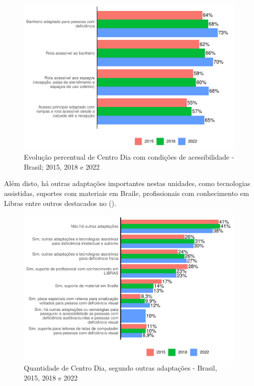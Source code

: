 \documentclass[
  brazilian]{report}
\begin{document}
\begin{figure}
\includegraphics{Censo-SUAS-2022_files/figure-latex/cdia-acessibilidade-1} \caption[Evolução percentual de Centro Dia com condições de acessibilidade - Brasil]{Evolução percentual de Centro Dia com condições de acessibilidade - Brasil; 2015, 2018 e 2022}\label{fig:cdia-acessibilidade}
\end{figure}

Além disto, há outras adaptações importantes nestas unidades, como
tecnologias assistidas, suportes com materiais em Braile, profissionais
com conhecimento em Libras entre outros destacados no
().

\begin{figure}
\includegraphics{Censo-SUAS-2022_files/figure-latex/cdia_adaptações-1} \caption[Quantidade de Centro Dia, segundo outras adaptações - Brasil, 2015, 2018 e 2022]{Quantidade de Centro Dia, segundo outras adaptações - Brasil, 2015, 2018 e 2022}\label{fig:cdia_adaptações}
\end{figure}
\end{document}

